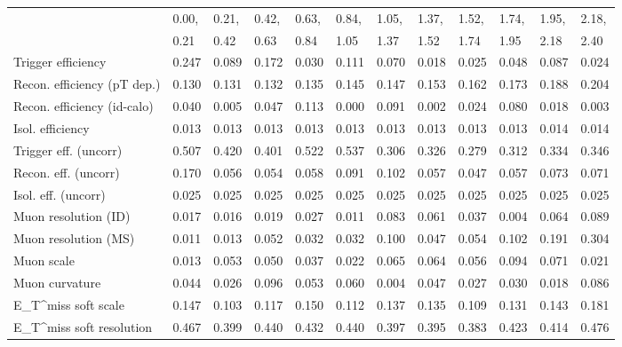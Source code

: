 \begin{tabular}{l|p{0.6cm}p{0.6cm}p{0.6cm}p{0.6cm}p{0.6cm}p{0.6cm}p{0.6cm}p{0.6cm}p{0.6cm}p{0.6cm}p{0.6cm}}
\hline
   & 0.00, & 0.21, & 0.42, & 0.63, & 0.84, & 1.05, & 1.37, & 1.52, & 1.74, & 1.95, & 2.18,  \\ 
   & 0.21 & 0.42 & 0.63 & 0.84 & 1.05 & 1.37 & 1.52 & 1.74 & 1.95 & 2.18 & 2.40  \\ 
\hline
Trigger efficiency                       & 0.247 & 0.089 & 0.172 & 0.030 & 0.111 & 0.070 & 0.018 & 0.025 & 0.048 & 0.087 & 0.024 \\
Recon. efficiency (pT dep.)              & 0.130 & 0.131 & 0.132 & 0.135 & 0.145 & 0.147 & 0.153 & 0.162 & 0.173 & 0.188 & 0.204 \\
Recon. efficiency (id-calo)              & 0.040 & 0.005 & 0.047 & 0.113 & 0.000 & 0.091 & 0.002 & 0.024 & 0.080 & 0.018 & 0.003 \\
Isol. efficiency                         & 0.013 & 0.013 & 0.013 & 0.013 & 0.013 & 0.013 & 0.013 & 0.013 & 0.013 & 0.014 & 0.014 \\
Trigger eff. (uncorr)                    & 0.507 & 0.420 & 0.401 & 0.522 & 0.537 & 0.306 & 0.326 & 0.279 & 0.312 & 0.334 & 0.346 \\
Recon. eff. (uncorr)                     & 0.170 & 0.056 & 0.054 & 0.058 & 0.091 & 0.102 & 0.057 & 0.047 & 0.057 & 0.073 & 0.071 \\
Isol. eff. (uncorr)                      & 0.025 & 0.025 & 0.025 & 0.025 & 0.025 & 0.025 & 0.025 & 0.025 & 0.025 & 0.025 & 0.025 \\
Muon resolution (ID)                     & 0.017 & 0.016 & 0.019 & 0.027 & 0.011 & 0.083 & 0.061 & 0.037 & 0.004 & 0.064 & 0.089 \\
Muon resolution (MS)                     & 0.011 & 0.013 & 0.052 & 0.032 & 0.032 & 0.100 & 0.047 & 0.054 & 0.102 & 0.191 & 0.304 \\
Muon scale                               & 0.013 & 0.053 & 0.050 & 0.037 & 0.022 & 0.065 & 0.064 & 0.056 & 0.094 & 0.071 & 0.021 \\
Muon curvature                           & 0.044 & 0.026 & 0.096 & 0.053 & 0.060 & 0.004 & 0.047 & 0.027 & 0.030 & 0.018 & 0.086 \\
E_{T}^{miss} soft scale                  & 0.147 & 0.103 & 0.117 & 0.150 & 0.112 & 0.137 & 0.135 & 0.109 & 0.131 & 0.143 & 0.181 \\
E_{T}^{miss} soft resolution             & 0.467 & 0.399 & 0.440 & 0.432 & 0.440 & 0.397 & 0.395 & 0.383 & 0.423 & 0.414 & 0.476 \\

\end{tabular}
